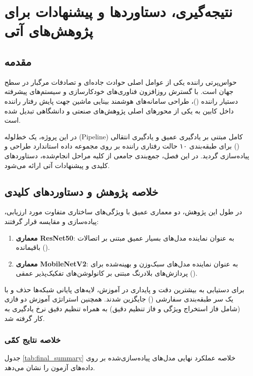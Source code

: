 \documentclass{report}
\begin{document}
 	
 	
 	
 	
 	\chapter{نتیجه‌گیری، دستاوردها و پیشنهادات برای پژوهش‌های آتی}
 	
 	\section{مقدمه}
 	حواس‌پرتی راننده یکی از عوامل اصلی حوادث جاده‌ای و تصادفات مرگبار در سطح جهان است. با گسترش روزافزون فناوری‌های خودکارسازی و سیستم‌های پیشرفته دستیار راننده ()، طراحی سامانه‌های هوشمند بینایی ماشین جهت پایش رفتار راننده داخل کابین به یکی از محورهای اصلی پژوهش‌های صنعتی و دانشگاهی تبدیل شده است.
 	
 	در این پروژه، یک خط‌لوله (Pipeline) کامل مبتنی بر یادگیری عمیق و یادگیری انتقالی () برای طبقه‌بندی ۱۰ حالت رفتاری راننده بر روی مجموعه داده استاندارد  طراحی و پیاده‌سازی گردید. در این فصل، جمع‌بندی جامعی از کلیه مراحل انجام‌شده، دستاوردهای کلیدی و پیشنهادات آتی ارائه می‌شود.
 	
 	\section{خلاصه پژوهش و دستاوردهای کلیدی}
 	در طول این پژوهش، دو معماری عمیق با ویژگی‌های ساختاری متفاوت مورد ارزیابی، پیاده‌سازی و مقایسه قرار گرفتند:
 	\begin{enumerate}
 		\item \textbf{معماری ResNet50}: به عنوان نماینده مدل‌های بسیار عمیق مبتنی بر اتصالات باقیمانده ().
 		\item \textbf{معماری MobileNetV2}: به عنوان نماینده مدل‌های سبک‌وزن و بهینه‌شده برای پردازش‌های بلادرنگ مبتنی بر کانولوشن‌های تفکیک‌پذیر عمقی ().
 		\end{enumerate}
 			
 			برای دستیابی به بیشترین دقت و پایداری در آموزش، لایه‌های پایانی شبکه‌ها حذف و با یک سر طبقه‌بندی سفارشی () جایگزین شدند. همچنین استراتژی آموزش دو فازی (شامل فاز استخراج ویژگی و فاز تنظیم دقیق) به همراه تنظیم دقیق نرخ یادگیری به کار گرفته شد.
 			
 			\subsection{خلاصه نتایج کمّی}
 			جدول \ref{tab:final_summary} خلاصه عملکرد نهایی مدل‌های پیاده‌سازی‌شده بر روی داده‌های آزمون را نشان می‌دهد.
 			
\end{document}
